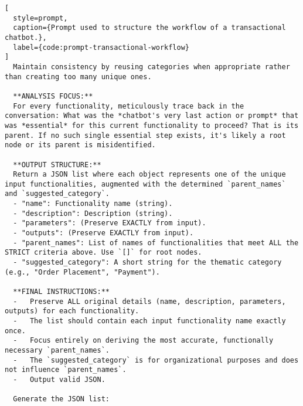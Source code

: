 \begin{lstlisting}[
  style=prompt,
  caption={Prompt used to structure the workflow of a transactional chatbot.},
  label={code:prompt-transactional-workflow}
]
  Maintain consistency by reusing categories when appropriate rather than creating too many unique ones.

  **ANALYSIS FOCUS:**
  For every functionality, meticulously trace back in the conversation: What was the *chatbot's very last action or prompt* that was *essential* for this current functionality to proceed? That is its parent. If no such single essential step exists, it's likely a root node or its parent is misidentified.

  **OUTPUT STRUCTURE:**
  Return a JSON list where each object represents one of the unique input functionalities, augmented with the determined `parent_names` and `suggested_category`.
  - "name": Functionality name (string).
  - "description": Description (string).
  - "parameters": (Preserve EXACTLY from input).
  - "outputs": (Preserve EXACTLY from input).
  - "parent_names": List of names of functionalities that meet ALL the STRICT criteria above. Use `[]` for root nodes.
  - "suggested_category": A short string for the thematic category (e.g., "Order Placement", "Payment").

  **FINAL INSTRUCTIONS:**
  -   Preserve ALL original details (name, description, parameters, outputs) for each functionality.
  -   The list should contain each input functionality name exactly once.
  -   Focus entirely on deriving the most accurate, functionally necessary `parent_names`.
  -   The `suggested_category` is for organizational purposes and does not influence `parent_names`.
  -   Output valid JSON.

  Generate the JSON list:
\end{lstlisting}


